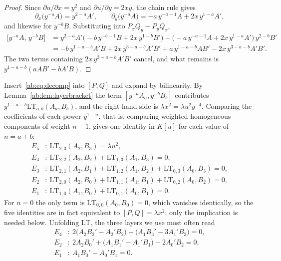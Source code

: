 \documentclass[a4paper,11pt]{article}
\theoremstyle{jsplain}
\theoremstyle{jsdef}
\theoremstyle{jsrem}
\begin{document}
\begin{proof}
Since $\partial u/\partial x=y^2$ and $\partial u/\partial y=2xy$, the chain rule gives
\[
\partial_x\bigl(y^{-a}A\bigr)=y^{2-a}A',\qquad \partial_y\bigl(y^{-a}A\bigr)=-a\,y^{-a-1}A+2x\,y^{1-a}A',
\]
and likewise for $y^{-b}B$. Substituting into $P_xQ_y-P_yQ_x$,
\begin{align*}
\bigl[y^{-a}A,\,y^{-b}B\bigr]
&=y^{2-a}A'\bigl(-b\,y^{-b-1}B+2x\,y^{1-b}B'\bigr)-\bigl(-a\,y^{-a-1}A+2x\,y^{1-a}A'\bigr)\,y^{2-b}B'\\
&=-b\,y^{1-a-b}A'B+2x\,y^{3-a-b}A'B'+a\,y^{1-a-b}AB'-2x\,y^{3-a-b}A'B'.
\end{align*}
The two terms containing $2x\,y^{3-a-b}A'B'$ cancel, and what remains is $y^{1-a-b}(aAB'-bA'B)$.
\end{proof}

Insert~\eqref{ab:eq:decomp} into $[P,Q]$ and expand by bilinearity. By Lemma~\ref{ab:lem:layerbracket} the term $[y^{-a}A_a,y^{-b}B_b]$ contributes $y^{1-a-b}\mathrm{LT}_{a,b}(A_a,B_b)$, and the right-hand side is $\lambda x^2=\lambda u^2y^{-4}$. Comparing the coefficients of each power $y^{1-n}$, that is, comparing weighted homogeneous components of weight $n-1$, gives one identity in $K[u]$ for each value of $n=a+b$:
\begin{align*}
E_5&\colon\ \mathrm{LT}_{2,3}(A_2,B_3)=\lambda u^2,\\
E_4&\colon\ \mathrm{LT}_{2,2}(A_2,B_2)+\mathrm{LT}_{1,3}(A_1,B_3)=0,\\
E_3&\colon\ \mathrm{LT}_{2,1}(A_2,B_1)+\mathrm{LT}_{1,2}(A_1,B_2)+\mathrm{LT}_{0,3}(A_0,B_3)=0,\\
E_2&\colon\ \mathrm{LT}_{2,0}(A_2,B_0)+\mathrm{LT}_{1,1}(A_1,B_1)+\mathrm{LT}_{0,2}(A_0,B_2)=0,\\
E_1&\colon\ \mathrm{LT}_{1,0}(A_1,B_0)+\mathrm{LT}_{0,1}(A_0,B_1)=0 .
\end{align*}
For $n=0$ the only term is $\mathrm{LT}_{0,0}(A_0,B_0)=0$, which vanishes identically, so the five identities are in fact equivalent to $[P,Q]=\lambda x^2$; only the implication is needed below. Unfolding $\mathrm{LT}$, the three layers we use most often read
\begin{align*}
E_4&\colon\ 2\bigl(A_2B_2'-A_2'B_2\bigr)+\bigl(A_1B_3'-3A_1'B_3\bigr)=0,\\
E_2&\colon\ 2A_2B_0'+\bigl(A_1B_1'-A_1'B_1\bigr)-2A_0'B_2=0,\\
E_1&\colon\ A_1B_0'-A_0'B_1=0 .
\end{align*}
\end{document}

